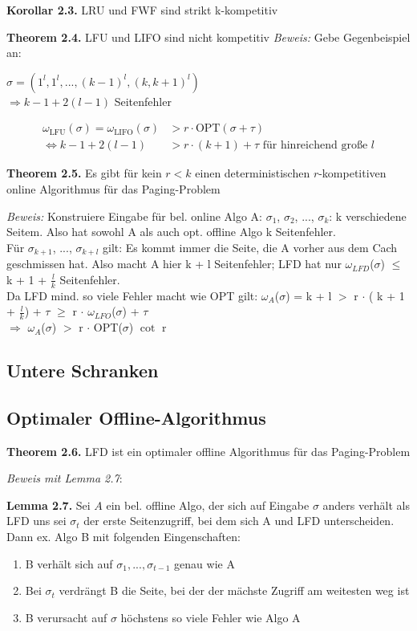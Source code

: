 \textbf{Korollar 2.3.} LRU und FWF sind strikt k-kompetitiv



\textbf{Theorem 2.4.} LFU und LIFO sind nicht kompetitiv
\textit{Beweis:} Gebe Gegenbeispiel an:

$\sigma = \left(1^l, 1^l, ..., (k-1)^l, (k, k+1)^l\right)$\\
$\Rightarrow k - 1 + 2(l - 1)$ Seitenfehler

\begin{align*}
\omega_{\textrm{LFU}}(\sigma) = \omega_{\textrm{LIFO}}(\sigma) &> r \cdot \textrm{OPT}(\sigma + \tau)\\
\Leftrightarrow k - 1 + 2 (l - 1) &> r \cdot (k + 1) + \tau \textrm{ für hinreichend große } l
\end{align*}



\textbf{Theorem 2.5.} Es gibt für kein $r < k$ einen deterministischen $r$-kompetitiven online Algorithmus für das Paging-Problem

\textit{Beweis:} Konstruiere Eingabe für bel. online Algo A: $\sigma_{1}$, $\sigma_{2}$, ..., $\sigma_{k}$: k verschiedene Seitem. Also hat sowohl A als auch opt. offline Algo k Seitenfehler.\\
Für $\sigma_{k + 1}$, ..., $\sigma_{k + l}$ gilt: Es kommt immer die Seite, die A vorher aus dem Cach geschmissen hat. Also macht A hier k + l Seitenfehler; LFD hat nur $\omega_{LFD}$($\sigma$) $\le$ k + 1 + $\tfrac{l}{k}$ Seitenfehler. \\
Da LFD mind. so viele Fehler macht wie OPT gilt: $\omega_{A}$($\sigma$) = k + l $>$ r $\cdot$ ( k + 1 + $\tfrac{l}{k}$) + $\tau$ $\ge$ r $\cdot$ $\omega_{LFO}$($\sigma$) + $\tau$ \\
 $\Rightarrow$  $\omega_{A}$($\sigma$) $>$ r $\cdot$ OPT($\sigma$) $\cot$ r


\subsection{Untere Schranken}


\subsection{Optimaler Offline-Algorithmus}

\textbf{Theorem 2.6.} LFD ist ein optimaler offline Algorithmus für das Paging-Problem

\textit{Beweis mit Lemma 2.7}:

\textbf{Lemma 2.7.} Sei $A$ ein bel. offline Algo, der sich auf Eingabe $\sigma$ anders verhält als LFD uns sei $\sigma_{t}$ der erste Seitenzugriff, bei dem sich A und LFD unterscheiden. Dann ex. Algo B mit folgenden Eingenschaften:
\begin{enumerate}
\item B verhält sich auf $\sigma_{1}, ..., \sigma_{t - 1}$ genau wie A
\item Bei $\sigma_{t}$ verdrängt B die Seite, bei der der mächste Zugriff am weitesten weg ist
\item B verursacht auf $\sigma$ höchstens so viele Fehler wie Algo A
\end{enumerate}

